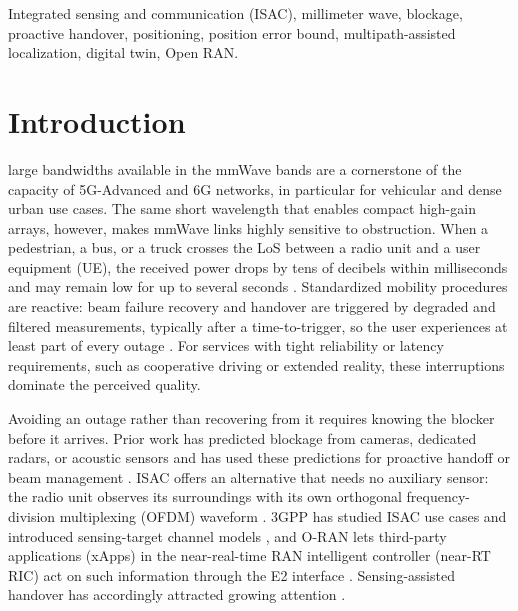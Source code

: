 \documentclass[journal]{IEEEtran}
\begin{document}
\begin{IEEEkeywords}
Integrated sensing and communication (ISAC), millimeter wave, blockage,
proactive handover, positioning, position error bound, multipath-assisted
localization, digital twin, Open RAN.
\end{IEEEkeywords}

\section{Introduction}
 large bandwidths available in the mmWave bands are
a cornerstone of the capacity of 5G-Advanced and 6G networks, in
particular for vehicular and dense urban use cases. The same short
wavelength that enables compact high-gain arrays, however, makes mmWave
links highly sensitive to obstruction. When a pedestrian, a bus, or a
truck crosses the LoS between a radio unit and a user equipment (UE),
the received power drops by tens of decibels within milliseconds and
may remain low for up to several seconds
\cite{rappaport2013mmwave,maccartney2017blockage}. Standardized mobility
procedures are reactive: beam failure recovery and handover are
triggered by degraded and filtered measurements, typically after a
time-to-trigger, so the user experiences at least part of every outage
\cite{3gpp38331,3gpp38300}. For services with tight reliability or
latency requirements, such as cooperative driving or extended reality,
these interruptions dominate the perceived quality.

Avoiding an outage rather than recovering from it requires knowing the
blocker before it arrives. Prior work has predicted blockage from
cameras, dedicated radars, or acoustic sensors and has used these
predictions for proactive handoff or beam management
\cite{charan2021vision,demirhan2022radarblockage,alquraan2023radar,hanahara2024acoustic}.
ISAC offers an alternative that needs no auxiliary sensor: the radio
unit observes its surroundings with its own orthogonal
frequency-division multiplexing (OFDM) waveform
\cite{liu2022isac,sturm2011ofdm}. 3GPP has studied ISAC use cases and
introduced sensing-target channel models \cite{3gpp22837,3gpp38901}, and
O-RAN lets third-party applications (xApps) in the near-real-time RAN
intelligent controller (near-RT RIC) act on such information through the
E2 interface \cite{polese2023oran,bonati2021intelligence}. Sensing-assisted
handover has accordingly attracted growing attention
\cite{li2025lookbefore,alquraan2023radar}.
\end{document}

